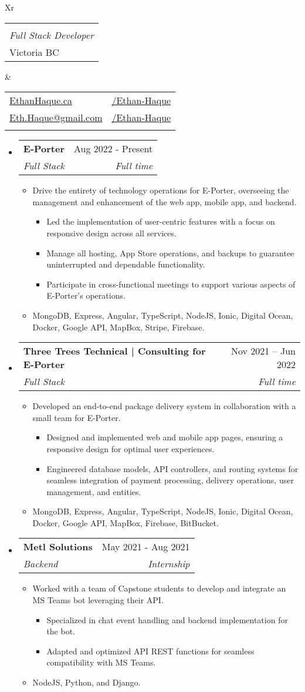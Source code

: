 \documentclass[letterpaper,11pt]{article}[leftmargin=*]
\makeatletter
\def \fullname {Ethan Haque}
\def \subtitle {Full Stack Developer}
\def \linkedinicon {\faLinkedin}
\def \linkedinlink {https://www.linkedin.com/in/ethan-haque}
\def \linkedintext {/Ethan-Haque}
\def \phoneicon {\faPhone}
\def \phonetext {250-880-4402}
\def \emailicon {\faEnvelope}
\def \emaillink {mailto:eth.haque@gmail.com}
\def \emailtext {Eth.Haque@gmail.com}
\def \githubicon {\faGithub}
\def \githublink {https://github.com/Ethan-Haque}
\def \githubtext {/Ethan-Haque}
\def \websiteicon {\faGlobe}
\def \websitelink {https://ethanhaque.ca}
\def \websitetext {EthanHaque.ca}
\def \headertype {\doublecol} %
\def \entryspacing {-0pt}
\def \linkedin {\linkedinicon \hspace{3pt}\href{\linkedinlink}{\linkedintext}}
\def \phone {\phoneicon \hspace{3pt}{ \phonetext}}
\def \email {\emailicon \hspace{3pt}\href{\emaillink}{\emailtext}}
\def \github {\githubicon \hspace{3pt}\href{\githublink}{\githubtext}}
\def \website {\websiteicon \hspace{3pt}\href{\websitelink}{\websitetext}}
\renewcommand{\section}[2]{\vspace{5pt}
  \tcbox[on line,boxsep=0pt,left=2pt,right=2pt,top=2pt,bottom=2pt,colback=secondary]
  {\color{white}\raggedbottom\normalsize\textbf{{#1}{\hspace{7pt}#2}}}
}
\newcommand{\resumeEntryStart}{\begin{itemize}[leftmargin=2.5mm]}
\newcommand{\resumeEntryEnd}{\end{itemize}\vspace{\entryspacing}}
\newcommand{\resumeItemListStart}{\begin{itemize}[leftmargin=4.5mm]}
\newcommand{\resumeItemListEnd}{\end{itemize}}
\newcommand{\resumeItem}[1]{
  \item\small{
    {#1 \vspace{-2pt}}
  }
}
\newcommand{\resumeEntryTSDL}[4]{
  \vspace{-1pt}\item[]
    \begin{tabularx}{0.97\textwidth}{X@{\hspace{60pt}}r}
      \textbf{\color{primary}#1} & {\firabook\color{accent}\small#2} \\
      \textit{\color{accent}\small#3} & \textit{\color{accent}\small#4} \\
    \end{tabularx}\vspace{-6pt}
}
\newcommand{\doublecol}[6]{
  \begin{tabularx}{\textwidth}{Xr}
    {
      \begin{tabular}[c]{l}
        \fontsize{35}{45}\selectfont{\color{primary}{{\textbf{\fullname}}}} \\
        {\textit{\subtitle}} \\
          {\faHome} Victoria BC
      \end{tabular}
    } & {
      \begin{tabular}[c]{l@{\hspace{1.5em}}l}
        {\small#4} & {\small#1} \\
        {\small#5} & {\small#2} \\
        {\small#6} & {\small#3}
      \end{tabular}
    }
  \end{tabularx}
}
\newcommand{\singlecol}[6]{
  \begin{tabularx}{\textwidth}{Xr}
    {
      \begin{tabular}[b]{l}
        \fontsize{35}{45}\selectfont{\color{primary}{{\textbf{\fullname}}}} \\
        {\textit{\subtitle}} %
      \end{tabular}
    } & {
      \begin{tabular}[c]{l}
        {\small#1} \\
        {\small#2} \\
        {\small#3} \\
        {\small#4} \\
        {\small#5} \\
        {\small#6}
      \end{tabular}
    }
  \end{tabularx}
}
\makeatother
\begin{document}


\headertype{\linkedin}{\github}{}{\website}{\email}{\phone} %


\section{\faPieChart}{Work Experience}

\resumeEntryStart
    \resumeEntryTSDL
      {E-Porter}{Aug 2022 - Present}
      {Full Stack}{Full time}
    \resumeItemListStart
      \resumeItem {Drive the entirety of technology operations for E-Porter, overseeing the management and enhancement of the web app, mobile app, and backend.}
      \resumeItemListStart
        \resumeItem {Led the implementation of user-centric features with a focus on responsive design across all services.}
        \resumeItem{Manage all hosting, App Store operations, and backups to guarantee uninterrupted and dependable functionality.}
        \resumeItem{Participate in cross-functional meetings to support various aspects of E-Porter's operations.}
      \resumeItemListEnd
      \resumeItem {MongoDB, Express, Angular, TypeScript, NodeJS, Ionic, Digital Ocean, Docker, Google API, MapBox, Stripe, Firebase.}
    \resumeItemListEnd
  
    \resumeEntryTSDL
      {Three Trees Technical | Consulting for E-Porter}{Nov 2021 -- Jun 2022}
      {Full Stack}{Full time}
    \resumeItemListStart
      \resumeItem {Developed an end-to-end package delivery system in collaboration with a small team for E-Porter.}
      \resumeItemListStart
        \resumeItem {Designed and implemented web and mobile app pages, ensuring a responsive design for optimal user experiences.} 
        \resumeItem {Engineered database models, API controllers, and routing systems for seamless integration of payment processing, delivery operations, user management, and entities.}
      \resumeItemListEnd
      \resumeItem {MongoDB, Express, Angular, TypeScript, NodeJS, Ionic, Digital Ocean, Docker, Google API, MapBox, Firebase, BitBucket.}
    \resumeItemListEnd

    \resumeEntryTSDL
      {Metl Solutions}{May 2021 - Aug 2021}
      {Backend}{Internship}
    \resumeItemListStart
      \resumeItem {Worked with a team of Capstone students to develop and integrate an MS Teams bot leveraging their API.}
      \resumeItemListStart
          \resumeItem {Specialized in chat event handling and backend implementation for the bot.}
          \resumeItem {Adapted and optimized API REST functions for seamless compatibility with MS Teams.}
       \resumeItemListEnd
       \resumeItem {NodeJS, Python, and Django.}
    \resumeItemListEnd
  \resumeEntryEnd
\end{document}

